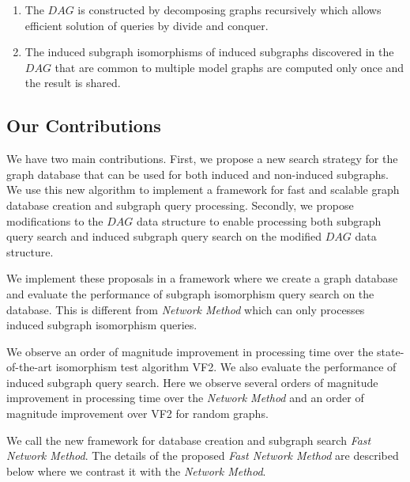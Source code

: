\begin{enumerate}
\item The $DAG$ is constructed by decomposing graphs recursively which allows efficient solution of queries by divide and conquer.
\item The induced subgraph isomorphisms of induced subgraphs discovered in the $DAG$ that are common to multiple model graphs are computed only once and the result is shared.
\end{enumerate}

\subsection{Our Contributions}
We have two main contributions. 
First, we propose a new search strategy for the graph database that can be used for both induced and non-induced subgraphs. 
We use this new algorithm to implement a framework for fast and scalable graph database creation and subgraph query processing. 
Secondly, we propose modifications to the $DAG$ data structure to enable processing both subgraph query search and induced subgraph query search on the modified $DAG$ data structure. 


We implement these proposals in a framework where we create a graph database and evaluate the performance of subgraph isomorphism query search on the database. 
This is different from \textit{Network Method} which can only processes induced subgraph isomorphism queries. 


We observe an order of magnitude improvement in processing time over the state-of-the-art isomorphism test algorithm VF2.  
We also evaluate the performance of induced subgraph query search. 
Here we observe several orders of magnitude improvement in processing time over the \textit{Network Method} and an order of magnitude improvement over VF2\cite{cordella2001_vf2} for random graphs.

We call the new framework for database creation and subgraph search \textit{Fast Network Method}. 
The details of the proposed \textit{Fast Network Method} are described below where we contrast it with the \textit{Network Method}.





